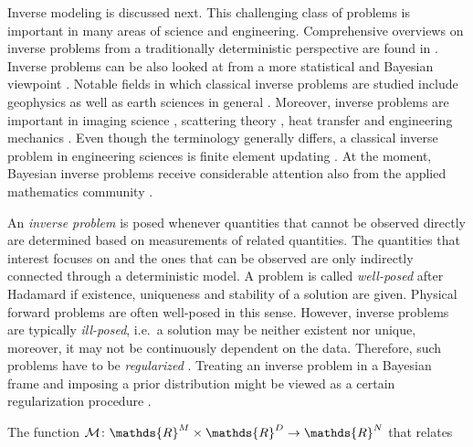 Inverse modeling is discussed next.
This challenging class of problems is important in many areas of science and engineering.
Comprehensive overviews on inverse problems from a traditionally deterministic perspective are found in \cite{Inversion:Isakov2006,Inversion:Kirsch2011}.
Inverse problems can be also looked at from a more statistical and Bayesian viewpoint \cite{Inversion:Tarantola2005,Inversion:Kaipio2005}.
Notable fields in which classical inverse problems are studied include
geophysics \cite{Inversion:Menke2012,Inversion:Zhdanov2015} as well as earth sciences in general \cite{Inversion:Bennett1992,Inversion:Bennett2002}.
Moreover, inverse problems are important in imaging science \cite{Inversion:Boccacci1998,Inversion:Chalmond2003},
scattering theory \cite{Inversion:Hopcraft1992,Inversion:Colton2013}, heat transfer \cite{Inversion:Alifanov1994,Inversion:Ozisik2000}
and engineering mechanics \cite{Inversion:Stavroulakis2001,Inversion:Liu2003,Inversion:Gladwell2004}.
Even though the terminology generally differs, a classical inverse problem in engineering sciences is finite element updating
\cite{Inversion:Friswell1995,Inversion:Marwala2010,Inversion:Marwala2017}.
At the moment, Bayesian inverse problems receive considerable attention also from the applied mathematics community \cite{Bayesian:Stuart2010,Bayesian:Dashti2016}.
\par %
An \emph{inverse problem} is posed whenever quantities that cannot be observed directly are determined based on measurements of related quantities.
The quantities that interest focuses on and the ones that can be observed are only indirectly connected through a deterministic model.
A problem is called \emph{well-posed} after Hadamard if existence, uniqueness and stability of a solution are given.
Physical forward problems are often well-posed in this sense.
However, inverse problems are typically \emph{ill-posed}, i.e.\ a solution may be neither existent nor unique, moreover, it may not be continuously dependent on the data.
Therefore, such problems have to be \emph{regularized} \cite{Inversion:Tikhonov1977,Inversion:Tikhonov1995,Inversion:Engl1996}.
Treating an inverse problem in a Bayesian frame and imposing a prior distribution might be viewed as a certain regularization procedure \cite{Inversion:Idier2008}.
\par %
The function \(\mathcal{M} \colon \mathds{R}^\dimParam \times \mathds{R}^\dimControl \rightarrow \mathds{R}^\dimData\) that relates
